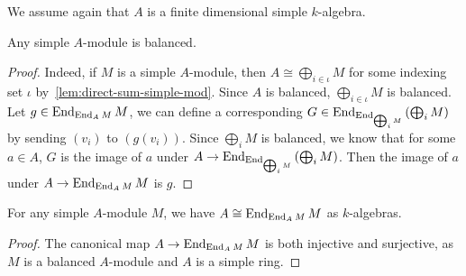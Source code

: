 We assume again that $A$ is a finite dimensional simple $k$-algebra.
\begin{lemma}
  Any simple $A$-module is balanced.
  \leanok
\end{lemma}
\begin{proof}
  Indeed, if $M$ is a simple $A$-module, then $A \cong \bigoplus_{i\in\iota} M$
  for some indexing set $\iota$ by~\cref{lem:direct-sum-simple-mod}. Since $A$
  is balanced, $\bigoplus_{i\in\iota}M$ is balanced. Let
  $g \in \operatorname{End}_{\operatorname{End}_{A}M}M$, we can define a corresponding
  $G \in \operatorname{End}_{\operatorname{End}_{\bigoplus_{i}M}}\left(\bigoplus_{i}M\right)$ by sending
  $(v_{i})$ to $(g(v_{i}))$. Since $\bigoplus_{i}M$ is balanced, we know that
  for some $a\in A$, $G$ is the image of $a$ under
  $A \to \operatorname{End}_{\operatorname{End}_{\bigoplus_{i}M}}\left(\bigoplus_{i}M\right)$. Then the
  image of $a$ under $A \to \operatorname{End}_{\operatorname{End}_{A}M}M$ is $g$.
\end{proof}

\begin{lemma}\label{lem:iso-end-end}
  For any simple $A$-module $M$, we have $A \cong \operatorname{End}_{\operatorname{End}_{A}M}M$ as
  $k$-algebras.
\end{lemma}
\begin{proof}
  The canonical map $A \to \operatorname{End}_{\operatorname{End}_{A}M}M$ is both injective and surjective,
  as $M$ is a balanced $A$-module and $A$ is a simple ring.
\end{proof}


